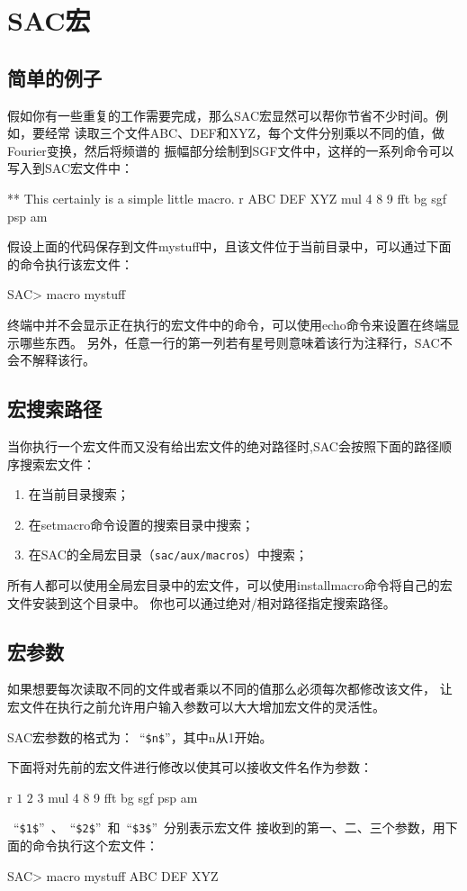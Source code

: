 \section{SAC宏}
\label{sec:macros}

\subsection{简单的例子}
假如你有一些重复的工作需要完成，那么SAC宏显然可以帮你节省不少时间。例如，要经常
读取三个文件ABC、DEF和XYZ，每个文件分别乘以不同的值，做Fourier变换，然后将频谱的
振幅部分绘制到SGF文件中，这样的一系列命令可以写入到SAC宏文件中：
\begin{SACCode}
** This certainly is a simple little macro.
r ABC DEF XYZ
mul 4 8 9
fft
bg sgf
psp am
\end{SACCode}

假设上面的代码保存到文件mystuff中，且该文件位于当前目录中，可以通过下面的命令执行该宏文件：
\begin{SACCode}
SAC> macro mystuff
\end{SACCode}
终端中并不会显示正在执行的宏文件中的命令，可以使用echo命令来设置在终端显示哪些东西。
另外，任意一行的第一列若有星号则意味着该行为注释行，SAC不会不解释该行。

\subsection{宏搜索路径}
当你执行一个宏文件而又没有给出宏文件的绝对路径时,SAC会按照下面的路径顺序搜索宏文件：
\begin{enumerate}
\item 在当前目录搜索；
\item 在setmacro命令设置的搜索目录中搜索；
\item 在SAC的全局宏目录（\texttt{sac/aux/macros}）中搜索；
\end{enumerate}

所有人都可以使用全局宏目录中的宏文件，可以使用installmacro命令将自己的宏文件安装到这个目录中。
你也可以通过绝对/相对路径指定搜索路径。

\subsection{宏参数}
如果想要每次读取不同的文件或者乘以不同的值那么必须每次都修改该文件，
让宏文件在执行之前允许用户输入参数可以大大增加宏文件的灵活性。

SAC宏参数的格式为：~``\lstinline{$n$}''，其中n从1开始。

下面将对先前的宏文件进行修改以使其可以接收文件名作为参数：
\begin{SACCode}
r $1$ $2$ $3$
mul 4 8 9
fft
bg sgf
psp am
\end{SACCode}
~``\lstinline{$1$}''~、~``\lstinline{$2$}''~和~``\lstinline{$3$}''~分别表示宏文件
接收到的第一、二、三个参数，用下面的命令执行这个宏文件：
\begin{SACCode}
SAC> macro mystuff ABC DEF XYZ 
\end{SACCode}

